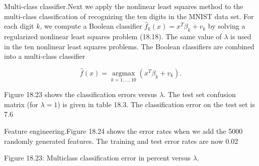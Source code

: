 Multi-class classifier.Next we apply the nonlinear least squares method to the multi-class classification of recognizing the ten digits in the MNIST data set. For each digit \(k\), we compute a Boolean classifier \(\hat{f}_{k}(x)=x^{T}\beta_{k}+v_{k}\) by solving a regularized nonlinear least squares problem (18.18). The same value of \(\lambda\) is used in the ten nonlinear least squares problems. The Boolean classifiers are combined into a multi-class classifier

\[\hat{f}(x)=\operatorname*{argmax}_{k=1,\ldots,10}{(x^{T}\beta_{k}+v_{k})}.\]

Figure 18.23 shows the classification errors versus \(\lambda\). The test set confusion matrix (for \(\lambda=1\)) is given in table 18.3. The classification error on the test set is 7.6%

Feature engineering.Figure 18.24 shows the error rates when we add the 5000 randomly generated features. The training and test error rates are now 0.02%

Figure 18.23: Multiclass classification error in percent versus \(\lambda\).

 